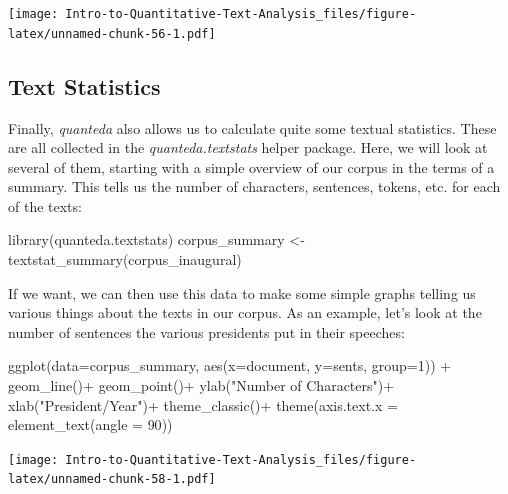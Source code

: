 \documentclass[
]{article}
\newenvironment{Shaded}{\begin{snugshade}}{\end{snugshade}}
\newcommand{\AttributeTok}[1]{\textcolor[rgb]{0.77,0.63,0.00}{#1}}
\newcommand{\DecValTok}[1]{\textcolor[rgb]{0.00,0.00,0.81}{#1}}
\newcommand{\FunctionTok}[1]{\textcolor[rgb]{0.00,0.00,0.00}{#1}}
\newcommand{\NormalTok}[1]{#1}
\newcommand{\OtherTok}[1]{\textcolor[rgb]{0.56,0.35,0.01}{#1}}
\newcommand{\SpecialCharTok}[1]{\textcolor[rgb]{0.00,0.00,0.00}{#1}}
\newcommand{\StringTok}[1]{\textcolor[rgb]{0.31,0.60,0.02}{#1}}
\begin{document}
\texttt{[image: Intro-to-Quantitative-Text-Analysis\_files/figure-latex/unnamed-chunk-56-1.pdf]}

\hypertarget{text-statistics}{%
\subsection{Text Statistics}\label{text-statistics}}

Finally, \emph{quanteda} also allows us to calculate quite some textual statistics. These are all collected in the \emph{quanteda.textstats} helper package. Here, we will look at several of them, starting with a simple overview of our corpus in the terms of a summary. This tells us the number of characters, sentences, tokens, etc. for each of the texts:

\begin{Shaded}
\begin{Highlighting}[]
\FunctionTok{library}\NormalTok{(quanteda.textstats)}
\NormalTok{corpus\_summary }\OtherTok{\textless{}{-}} \FunctionTok{textstat\_summary}\NormalTok{(corpus\_inaugural)}
\end{Highlighting}
\end{Shaded}

If we want, we can then use this data to make some simple graphs telling us various things about the texts in our corpus. As an example, let's look at the number of sentences the various presidents put in their speeches:

\begin{Shaded}
\begin{Highlighting}[]
\FunctionTok{ggplot}\NormalTok{(}\AttributeTok{data=}\NormalTok{corpus\_summary, }\FunctionTok{aes}\NormalTok{(}\AttributeTok{x=}\NormalTok{document, }\AttributeTok{y=}\NormalTok{sents, }\AttributeTok{group=}\DecValTok{1}\NormalTok{)) }\SpecialCharTok{+}
 \FunctionTok{geom\_line}\NormalTok{()}\SpecialCharTok{+}
 \FunctionTok{geom\_point}\NormalTok{()}\SpecialCharTok{+}
 \FunctionTok{ylab}\NormalTok{(}\StringTok{"Number of Characters"}\NormalTok{)}\SpecialCharTok{+}
 \FunctionTok{xlab}\NormalTok{(}\StringTok{"President/Year"}\NormalTok{)}\SpecialCharTok{+}
 \FunctionTok{theme\_classic}\NormalTok{()}\SpecialCharTok{+}
 \FunctionTok{theme}\NormalTok{(}\AttributeTok{axis.text.x =} \FunctionTok{element\_text}\NormalTok{(}\AttributeTok{angle =} \DecValTok{90}\NormalTok{))}
\end{Highlighting}
\end{Shaded}

\texttt{[image: Intro-to-Quantitative-Text-Analysis\_files/figure-latex/unnamed-chunk-58-1.pdf]}
\end{document}
